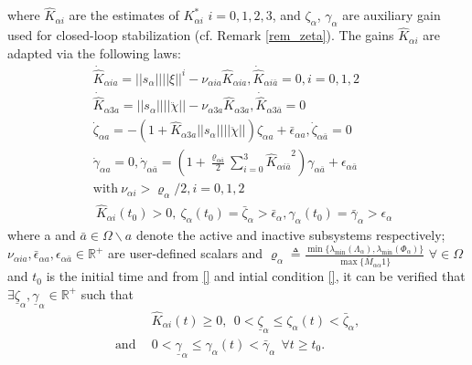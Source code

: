 \documentclass[letterpaper, 10 pt, conference]{ieeeconf}  %
\begin{document}
where $\hat{K}_{\alpha i}$ are the estimates of $K_{\alpha i}^*$ $i=0,1,2,3$, and $\zeta_{\alpha}$, $\gamma_{\alpha}$ are auxiliary gain used for closed-loop stabilization (cf. Remark \ref{rem_zeta}). The gains $\hat{K}_{\alpha i}$ are adapted via the following laws:
\begin{subequations}\label{adaptive_law_alpha}
\begin{align}
&\dot{\hat{K}}_{\alpha ia} = ||s_{\alpha}||||\xi||^i - \nu_{\alpha ia} \hat{K}_{\alpha ia}, \dot{\hat{K}}_{\alpha i\bar{a}} = 0,  i = 0,1,2
 \\
&\dot{\hat{K}}_{\alpha3a} =  ||s_{\alpha}||||\ddot{\chi}|| - \nu_{\alpha3a} \hat{K}_{\alpha3a}, \dot{\hat{K}}_{\alpha3\bar{a}} = 0\\
&\dot{\zeta}_{\alpha a} = -(1 + \hat{K}_{\alpha3a}||s_{\alpha}||||\ddot{\chi}||)\zeta_{\alpha a} + \bar{\epsilon}_{\alpha a}, \dot{\zeta}_{\alpha \bar{a}} = 0    \\ \label{zeta1}
& \dot{\gamma}_{\alpha a} = 0,  \dot{\gamma}_{\alpha\bar{a}} = \left(1+ \frac{\varrho_{\alpha\bar{a}}}{2}\sum \limits_{i=0}^{3} {\hat{K}_{\alpha i\bar{a}}}^2 \right) \gamma_{\alpha \bar{a}} +\epsilon_{\alpha \bar{a}} \\
& \text{with}~ \nu_{\alpha i} > \varrho_{\alpha}/2, i = 0,1,2\\
&~\hat{K}_{\alpha i} (t_0) > 0, ~\zeta_{\alpha } (t_0)  = \bar{\zeta}_{\alpha } > \bar{\epsilon}_{\alpha }, \gamma_{\alpha } (t_0) = \bar{\gamma}_{\alpha } > \epsilon_{\alpha }
\end{align}
\end{subequations}
where a and $\bar{a} \in \Omega \backslash {a}$ denote the active and inactive subsystems respectively; $\nu_{\alpha ia},\bar{\epsilon}_{\alpha a}, \epsilon_{\alpha\bar{a}}  \in\mathbb{R}^{+}$ are user-defined scalars and $\varrho_{\alpha} \triangleq \frac{\min \lbrace \lambda_{\min}(  \Lambda_{{\alpha}} ), \lambda_{\min}( \Phi_{{\alpha}} ) \rbrace}{\max \lbrace \bar{M}_{\alpha\alpha} 1 \rbrace}$ $\forall  \in \Omega$ and $t_0$ is the initial time and from \ref{} and intial condition \ref{}, it can be verified that $\exists \underline{\zeta}_{\alpha }, \underline{\gamma}_{\alpha } \in \mathbb{R}^{+}$ such that
\begin{subequations}
\begin{align}
&\hat{K}_{\alpha i}(t) \geq 0, ~~ 0 < \underline{\zeta}_{\alpha } \leq \zeta_{\alpha } (t) <  \bar{\zeta}_{\alpha }, \nonumber \\
\text{and}~~ & 0 < \underline{\gamma}_{\alpha } \leq \gamma_{\alpha } (t) <  \bar{\gamma}_{\alpha } ~~ \forall t \geq t_0.
\end{align}
\end{subequations}


% 
% 
\end{document}
